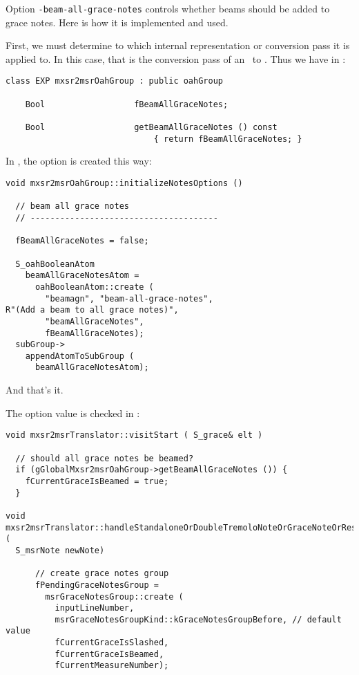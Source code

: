 {Option {\tt -beam-all-grace-notes} controls whether beams should be added to grace notes. Here is how it is implemented and used.

First, we must determine to which internal representation or conversion pass it is applied to. In this case, that is the conversion pass of an \mxsrRepr\ to \msrRepr.
Thus we have in :
\begin{lstlisting}[language=CPlusPlus]
class EXP mxsr2msrOahGroup : public oahGroup

    Bool                  fBeamAllGraceNotes;

    Bool                  getBeamAllGraceNotes () const
                              { return fBeamAllGraceNotes; }
\end{lstlisting}

In , the option is created this way:
\begin{lstlisting}[language=CPlusPlus]
void mxsr2msrOahGroup::initializeNotesOptions ()

  // beam all grace notes
  // --------------------------------------

  fBeamAllGraceNotes = false;

  S_oahBooleanAtom
    beamAllGraceNotesAtom =
      oahBooleanAtom::create (
        "beamagn", "beam-all-grace-notes",
R"(Add a beam to all grace notes)",
        "beamAllGraceNotes",
        fBeamAllGraceNotes);
  subGroup->
    appendAtomToSubGroup (
      beamAllGraceNotesAtom);
\end{lstlisting}

And that's it.

The option value is checked in :
\begin{lstlisting}[language=CPlusPlus]
void mxsr2msrTranslator::visitStart ( S_grace& elt )

  // should all grace notes be beamed?
  if (gGlobalMxsr2msrOahGroup->getBeamAllGraceNotes ()) {
    fCurrentGraceIsBeamed = true;
  }

void mxsr2msrTranslator::handleStandaloneOrDoubleTremoloNoteOrGraceNoteOrRest (
  S_msrNote newNote)

      // create grace notes group
      fPendingGraceNotesGroup =
        msrGraceNotesGroup::create (
          inputLineNumber,
          msrGraceNotesGroupKind::kGraceNotesGroupBefore, // default value
          fCurrentGraceIsSlashed,
          fCurrentGraceIsBeamed,
          fCurrentMeasureNumber);


\end{lstlisting}}
